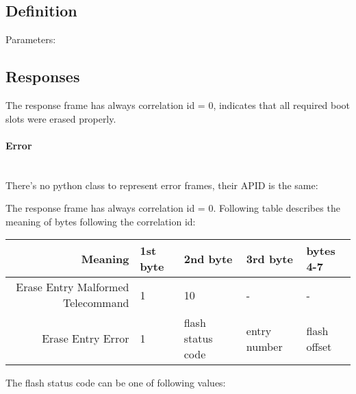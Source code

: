\subsection{Definition}

Parameters: 

\begin{tcarglist}
\end{tcarglist}

\subsection{Responses}
The response frame has always correlation id = 0, indicates that all required boot slots were erased properly.

\paragraph{Error}  \mbox{} \\

There's no python class to represent error frames, their APID is the same:

The response frame has always correlation id = 0. Following table describes the meaning of bytes following the correlation id:

\begin{tabular}{r | l | l | l | l}
    Meaning & 1st byte & 2nd byte & 3rd byte & bytes 4-7 \\
    \hline
    Erase Entry Malformed Telecommand & 1 & 10 & - & - \\
    Erase Entry Error & 1 & flash status code & entry number & flash offset \\
\end{tabular}

The flash status code can be one of following values: 

